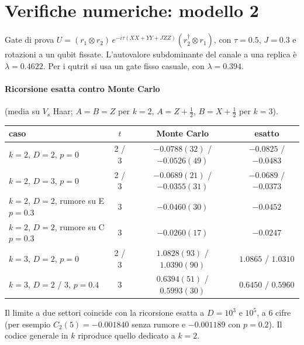 \section{Verifiche numeriche: modello 2}\label{app:num2}

Gate di prova $U=(r_1\otimes r_2)\,e^{-i\tau(XX+YY+JZZ)}(r_2^\dagger\otimes r_1)$, con $\tau=0.5$, $J=0.3$ e rotazioni a un qubit fissate. L'autovalore subdominante del canale a una replica è $\lambda=0.4622$. Per i qutrit si usa un gate fisso casuale, con $\lambda=0.394$.

\paragraph{Ricorsione esatta contro Monte Carlo} (media su $V_s$ Haar; $A=B=Z$ per $k=2$, $A=Z+\tfrac12$, $B=X+\tfrac12$ per $k=3$).
\begin{center}\small
\begin{tabular}{@{}lccc@{}}
\toprule
caso & $t$ & Monte Carlo & esatto\\
\midrule
$k=2$, $D=2$, $p=0$ & 2 / 3 & $-0.0788(32)$ / $-0.0526(49)$ & $-0.0825$ / $-0.0483$\\
$k=2$, $D=3$, $p=0$ & 2 / 3 & $-0.0689(21)$ / $-0.0355(31)$ & $-0.0689$ / $-0.0373$\\
$k=2$, $D=2$, rumore su E $p=0.3$ & 3 & $-0.0460(30)$ & $-0.0452$\\
$k=2$, $D=2$, rumore su C $p=0.3$ & 3 & $-0.0260(17)$ & $-0.0247$\\
$k=3$, $D=2$, $p=0$ & 2 / 3 & $1.0828(93)$ / $1.0390(90)$ & $1.0865$ / $1.0310$\\
$k=3$, $D=2$ / $3$, $p=0.4$ & 3 & $0.6394(51)$ / $0.5993(30)$ & $0.6450$ / $0.5960$\\
\bottomrule
\end{tabular}
\end{center}
Il limite a due settori coincide con la ricorsione esatta a $D=10^3$ e $10^5$, a 6 cifre (per esempio $C_2(5)=-0.001840$ senza rumore e $-0.001189$ con $p=0.2$). Il codice generale in $k$ riproduce quello dedicato a $k=2$.

